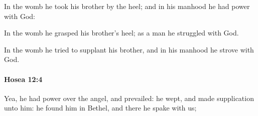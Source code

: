 			\begin{versebox}
					\item[BHS] 
					\item[LXX] 
					\item[ASV] In the womb he took his brother by the heel; and in his manhood he had power with God:
					\item[NIV] In the womb he grasped his brother’s heel; as a man he struggled with God.
					\item[NRSV] In the womb he tried to supplant his brother, and in his manhood he strove with God.
			\end{versebox}

		\paragraph{Hosea 12:4} %
			\label{HOSEA-12-4}

			Yea, he had power over the angel, and prevailed: he wept, and made supplication unto him: he found him in Bethel, and there he spake with us;

